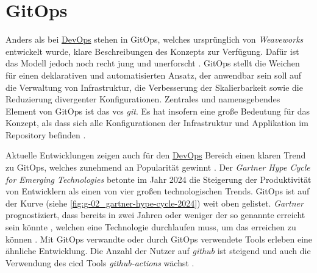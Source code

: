 \section{GitOps}
\label{sec:03-03_gitops}

Anders als bei \hyperref[sec:03-01_devops]{DevOps} stehen in GitOps, welches ursprünglich von \textit{Weaveworks} entwickelt wurde, klare Beschreibungen des Konzepts zur Verfügung. Dafür ist das Modell jedoch noch recht jung und unerforscht \cite{009:GitOps-Evolution-of-DevOps}. GitOps stellt die Weichen für einen deklarativen und automatisierten Ansatz, der anwendbar sein soll auf die Verwaltung von Infrastruktur, die Verbesserung der Skalierbarkeit sowie die Reduzierung divergenter Konfigurationen. Zentrales und namensgebendes Element von GitOps ist das \Gls{vcs} \textit{\Gls{git}}. Es hat insofern eine große Bedeutung für das Konzept, als dass sich alle Konfigurationen der Infrastruktur und Applikation im Repository befinden \cite{024:Investiugating-Impact-of-Containerization-on-Deployment-Process-in-DevOps}.

Aktuelle Entwicklungen zeigen auch für den \hyperref[sec:03-01_devops]{DevOps} Bereich einen klaren Trend zu GitOps, welches zunehmend an Popularität gewinnt \cite{024:Investiugating-Impact-of-Containerization-on-Deployment-Process-in-DevOps}. Der \textit{Gartner Hype Cycle for Emerging Technologies} betonte im Jahr 2024 die Steigerung der Produktivität von Entwicklern als einen von vier großen technologischen Trends. GitOps ist auf der Kurve (siehe \autoref{fig:g-02_gartner-hype-cycle-2024}) weit oben gelistet. \textit{Gartner} prognostiziert, dass bereits in zwei Jahren oder weniger der so genannte  erreicht sein könnte \cite{106:Gartner-2024-Hype-Cycle-for-Emerging-Technologies}, welchen eine Technologie durchlaufen muss, um das  erreichen zu können \cite{108:Gartner-Hype-Cycle}. Mit GitOps verwandte oder durch GitOps verwendete Tools erleben eine ähnliche Entwicklung. Die Anzahl der Nutzer auf \textit{\Gls{github}} ist steigend und auch die Verwendung des \Gls{cicd} Tools \textit{\Gls{github-actions}} wächst \cite{008:GitOps-Approach-to-Cloud-Cluster-System-Deployment}.

